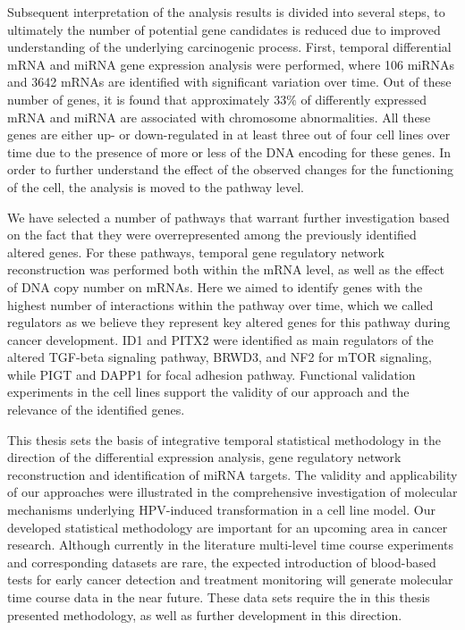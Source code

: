 \begin{summary}
Subsequent interpretation of the analysis results is divided into several steps, to ultimately  the number of potential gene candidates is reduced due to improved understanding of the underlying carcinogenic process. First, temporal differential mRNA and miRNA gene expression analysis were performed, where 106 miRNAs and 3642 mRNAs are identified with significant variation over time. Out of these number of genes, it is found that approximately 33$\%$ of differently expressed mRNA and miRNA are associated with chromosome abnormalities. All these genes are either up- or down-regulated in at least three out of four cell lines over time due to the presence of more or less of the DNA encoding for these genes. In order to further understand the effect of the observed changes for the functioning of the cell, the analysis is moved to the pathway level. 

We have selected  a number of  pathways that warrant further investigation based on the fact that they were overrepresented among the previously identified altered genes. For these pathways, temporal gene regulatory network reconstruction was performed both within the mRNA level, as well as the effect of DNA copy number on mRNAs. Here we aimed to identify genes with the highest number of interactions within the pathway over time, which we called regulators as we believe they represent key altered genes for this pathway during cancer development. ID1 and PITX2 were identified as main regulators of the altered TGF-beta signaling pathway, BRWD3, and NF2 for mTOR signaling, while PIGT and DAPP1 for focal adhesion pathway. Functional validation experiments in the cell lines support the validity of our approach and the relevance of the identified genes.

This thesis sets the basis of integrative temporal statistical methodology in the direction of the differential expression analysis, gene regulatory network reconstruction and identification of miRNA targets. The validity and applicability of our approaches were illustrated in the comprehensive investigation of molecular mechanisms underlying HPV-induced transformation in a cell line model. Our developed statistical methodology are important for an upcoming area in cancer research. Although currently in the literature multi-level time course experiments and corresponding datasets are rare, the expected introduction of  blood-based tests for early cancer detection and treatment monitoring will generate molecular time course data in the near future. These data sets require the in this thesis presented methodology, as well as further development in this direction.

\end{summary}

